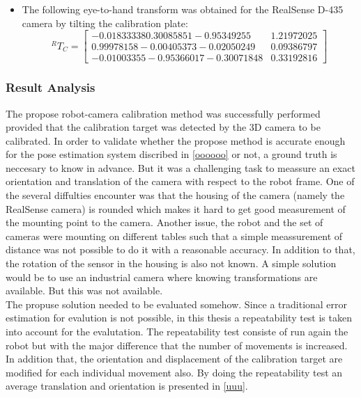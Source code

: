 \begin{itemize}
\item The following eye-to-hand transform was obtained for the RealSense D-435 camera by tilting the calibration plate:
\begin{equation}
^{R}T_{C}=\begin{bmatrix} -0.01833338  0.30085851 -0.95349255 & 1.21972025\\0.99978158 -0.00405373 -0.02050249& 0.09386797\\ -0.01003355 -0.95366017 -0.30071848& 0.33192816\end{bmatrix}
\end{equation}
\end{itemize}


\subsubsection{Result Analysis}

The propose robot-camera calibration method was successfully performed provided that the calibration target was detected by the 3D camera to be calibrated. In order to validate whether the propose method is accurate enough for the pose estimation system discribed in \ref{oooooo} or not, a ground truth is neccesary to know in advance. But it was a challenging task to meassure an exact orientation and translation of the camera with respect to the robot frame. One of the several diffulties encounter was that the housing of the camera (namely the RealSense camera) is rounded which makes it hard to get good measurement of the mounting point to the camera. Another issue, the robot and the set of cameras were mounting on different tables such that a simple meassurement of distance was not possible to do it with a reasonable accuracy. In addition to that, the rotation of the sensor in the housing is also not known. A simple solution would be to use an industrial camera where knowing transformations are available. But this was not available. \\
The propuse solution needed to be evaluated somehow. Since a traditional error estimation for evalution is not possible, in this thesis a repeatability test is taken into account for the evalutation. The repeatability test consiste of run again the robot but with the major difference that the number of movements is increased. In addition that, the orientation and displacement of the calibration target are modified for each individual movement also. By doing the repeatability test an average translation and orientation is presented in \ref{uuu}.












